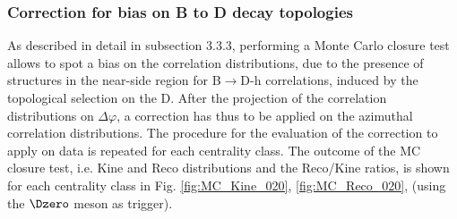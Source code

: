 \subsubsection{Correction for bias on B to D decay topologies}
As described in detail in subsection 3.3.3, performing a Monte Carlo closure test allows to spot a bias on the correlation distributions, due to the presence of structures in the near-side region for B$\rightarrow$D-h correlations, induced by the topological selection on the D.
After the projection of the correlation distributions on $\Delta\varphi$, a correction has thus to be applied on the azimuthal correlation distributions. The procedure for the evaluation of the correction to apply on data is repeated for each centrality class.
The outcome of the MC closure test, i.e. Kine and Reco distributions and the Reco/Kine ratios, is shown for each centrality class in Fig. \ref{fig:MC_Kine_020}, \ref{fig:MC_Reco_020}, \label{fig:MC_Ratio_60100} (using the $\Dzero$ meson as trigger).

